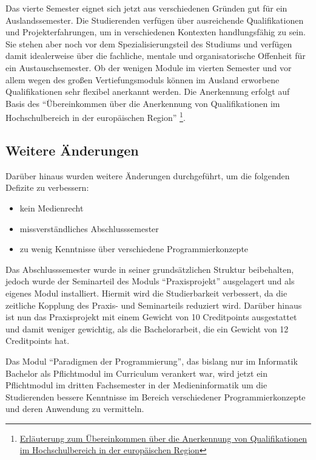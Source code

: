 Das vierte Semester eignet sich jetzt aus verschiedenen Gründen gut für
ein Auslandssemester. Die Studierenden verfügen über ausreichende
Qualifikationen und Projekterfahrungen, um in verschiedenen Kontexten
handlungsfähig zu sein. Sie stehen aber noch vor dem
Spezialisierungsteil des Studiums und verfügen damit idealerweise über
die fachliche, mentale und organisatorische Offenheit für ein
Austauschsemester. Ob der wenigen Module im vierten Semester und vor
allem wegen des großen Vertiefungsmoduls können im Ausland erworbene
Qualifikationen sehr flexibel anerkannt werden. Die Anerkennung erfolgt
auf Basis des ``Übereinkommen über die Anerkennung von Qualifikationen
im Hochschulbereich in der europäischen Region'' \footnote{\href{https://de.wikipedia.org/wiki/\%C3\%9Cbereinkommen_\%C3\%BCber_die_Anerkennung_von_Qualifikationen_im_Hochschulbereich_in_der_europ\%C3\%A4ischen_Region}{Erläuterung
  zum Übereinkommen über die Anerkennung von Qualifikationen im
  Hochschulbereich in der europäischen Region}}.

\subsection{Weitere Änderungen}\label{weitere-uxe4nderungen}

Darüber hinaus wurden weitere Änderungen durchgeführt, um die folgenden
Defizite zu verbessern:

\begin{itemize}
\tightlist
\item
  kein Medienrecht
\item
  missverständliches Abschlusssemester
\item
  zu wenig Kenntnisse über verschiedene Programmierkonzepte
\end{itemize}

Das Abschlusssemester wurde in seiner grundsätzlichen Struktur
beibehalten, jedoch wurde der Seminarteil des Moduls ``Praxisprojekt''
ausgelagert und als eigenes Modul installiert. Hiermit wird die
Studierbarkeit verbessert, da die zeitliche Kopplung des Praxis- und
Seminarteils reduziert wird. Darüber hinaus ist nun das Praxisprojekt
mit einem Gewicht von 10 Creditpoints ausgestattet und damit weniger
gewichtig, als die Bachelorarbeit, die ein Gewicht von 12 Creditpoints
hat.

Das Modul ``Paradigmen der Programmierung'', das bislang nur im
Informatik Bachelor als Pflichtmodul im Curriculum verankert war, wird
jetzt ein Pflichtmodul im dritten Fachsemester in der Medieninformatik
um die Studierenden bessere Kenntnisse im Bereich verschiedener
Programmierkonzepte und deren Anwendung zu vermitteln.

